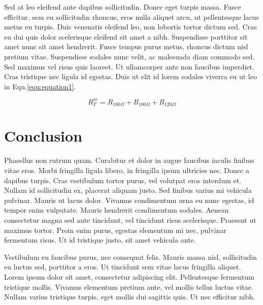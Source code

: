 \documentclass[11pt,oneside,openright]{book}
\begin{document}
Sed at leo eleifend ante dapibus sollicitudin. Donec eget turpis massa. Fusce efficitur, sem eu sollicitudin rhoncus, eros nulla aliquet arcu, ut pellentesque lacus metus eu turpis. Duis venenatis eleifend leo, non lobortis tortor dictum sed. Cras eu dui quis dolor scelerisque eleifend sit amet a nibh. Suspendisse porttitor sit amet nunc sit amet hendrerit. Fusce tempus purus metus, rhoncus dictum nisl pretium vitae. Suspendisse sodales nunc velit, ac malesuada diam commodo sed. Sed maximus vel risus quis laoreet. Ut ullamcorper ante non faucibus imperdiet. Cras tristique nec ligula id egestas. Duis ut elit id lorem sodales viverra eu ut leo in Equ.\ref{equ:equation1}.

\begin{equation}\label{equ:equation1}
R^m_T=R_{180\Omega}+R_{100\Omega}+R_{120\Omega}
\end{equation}



\chapter{Conclusion}\label{cpt:con}

Phasellus non rutrum quam. Curabitur et dolor in augue faucibus iaculis finibus vitae eros. Morbi fringilla ligula libero, in fringilla ipsum ultricies nec. Donec a dapibus turpis. Cras vestibulum tortor purus, vel volutpat eros interdum et. Nullam id sollicitudin ex, placerat aliquam justo. Sed finibus varius mi vehicula pulvinar. Mauris ut lacus dolor. Vivamus condimentum urna eu nunc egestas, id tempor enim vulputate. Mauris hendrerit condimentum sodales. Aenean consectetur magna sed ante tincidunt, vel tincidunt risus scelerisque. Praesent ut maximus tortor. Proin enim purus, egestas elementum mi nec, pulvinar fermentum risus. Ut id tristique justo, sit amet vehicula ante.

Vestibulum eu faucibus purus, nec consequat felis. Mauris massa nisl, sollicitudin eu luctus sed, porttitor a eros. Ut tincidunt sem vitae lacus fringilla aliquet. Lorem ipsum dolor sit amet, consectetur adipiscing elit. Pellentesque fermentum tristique mollis. Vivamus elementum pretium ante, vel mollis tellus luctus vitae. Nullam varius tristique turpis, eget mollis dui sagittis quis. Ut nec efficitur nibh.





\end{document}
